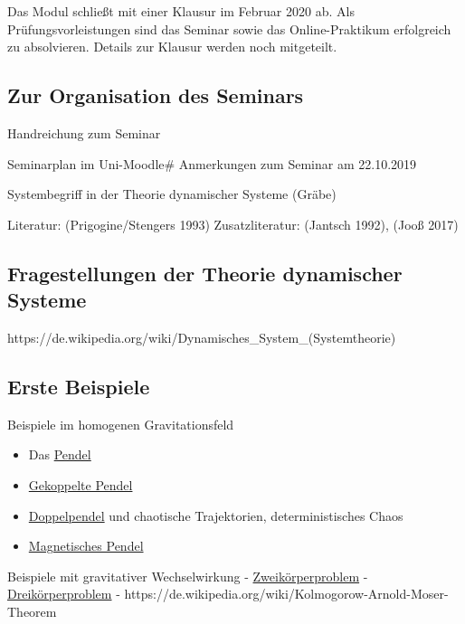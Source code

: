 \documentclass[11pt,a4paper]{article}
\begin{document}
Das Modul schließt mit einer Klausur im Februar 2020 ab. Als
Prüfungsvorleistungen sind das Seminar sowie das Online-Praktikum
erfolgreich zu absolvieren. Details zur Klausur werden noch mitgeteilt.

\hypertarget{zur-organisation-des-seminars}{%
\subsection{Zur Organisation des
Seminars}\label{zur-organisation-des-seminars}}

Handreichung zum Seminar

Seminarplan im Uni-Moodle\# Anmerkungen zum Seminar am 22.10.2019

Systembegriff in der Theorie dynamischer Systeme (Gräbe)

Literatur: (Prigogine/Stengers 1993) Zusatzliteratur: (Jantsch 1992),
(Jooß 2017)

\hypertarget{fragestellungen-der-theorie-dynamischer-systeme}{%
\subsection{Fragestellungen der Theorie dynamischer
Systeme}\label{fragestellungen-der-theorie-dynamischer-systeme}}

https://de.wikipedia.org/wiki/Dynamisches\_System\_(Systemtheorie)

\hypertarget{erste-beispiele}{%
\subsection{Erste Beispiele}\label{erste-beispiele}}

Beispiele im homogenen Gravitationsfeld

\begin{itemize}
[noitemsep]
\item
  Das \href{https://de.wikipedia.org/wiki/Pendel}{Pendel}
\item
  \href{https://de.wikipedia.org/wiki/Gekoppelte_Pendel}{Gekoppelte
  Pendel}
\item
  \href{https://de.wikipedia.org/wiki/Doppelpendel}{Doppelpendel} und
  chaotische Trajektorien, deterministisches Chaos
\item
  \href{https://de.wikipedia.org/wiki/Magnetisches_Pendel}{Magnetisches
  Pendel}
\end{itemize}

Beispiele mit gravitativer Wechselwirkung -
\href{https://de.wikipedia.org/wiki/Zweik\%C3\%B6rperproblem}{Zweikörperproblem}
-
\href{https://de.wikipedia.org/wiki/Dreik\%C3\%B6rperproblem}{Dreikörperproblem}
- https://de.wikipedia.org/wiki/Kolmogorow-Arnold-Moser-Theorem
\end{document}
